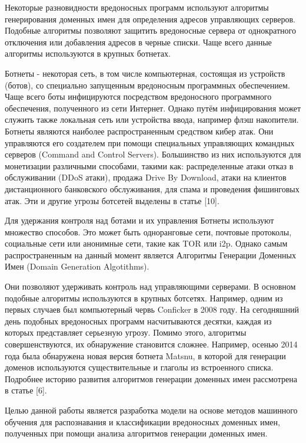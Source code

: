 
Некоторые разновидности вредоносных программ используют алгоритмы генерирования доменных имен для определения адресов управляющих серверов. Подобные алгоритмы позволяют защитить вредоносные сервера от однократного отключения или добавления адресов в черные списки. Чаще всего данные алгоритмы используются в крупных ботнетах.

Ботнеты - некоторая сеть, в том числе компьютерная, состоящая из устройств (ботов), со специально запущенным вредоносным программных обеспечением. Чаще всего боты инфицируются посредством вредоносного программного обеспечения, полученного из сети Интернет. Однако путём инфицирования может служить также локальная сеть или устройства ввода, например флэш накопители. Ботнеты являются наиболее распространенным средством кибер атак. Они управляются его создателем при помощи специальных управляющих командных серверов (Command and Control Servers). Большинство из них используются для монетизации различными способами, такими как: распределенные атаки отказ в обслуживании (DDoS атаки), продажа Drive By Download, атаки на клиентов дистанционного банковского обслуживания, для спама и проведения фишинговых атак. Эти и другие угрозы ботсетей выделены в статье [10].

Для удержания контроля над ботами и их управления Ботнеты используют множество способов. Это может быть одноранговые сети, почтовые протоколы, социальные сети или анонимные сети, такие как TOR или i2p.
Однако самым распространенным на данный момент является Алгоритмы Генерации Доменных Имен (Domain Generation Algotithms).

Они позволяют удерживать контроль над управляющими серверами. В основном подобные алгоритмы используются в крупных ботсетях. Например, одним из первых случаев был компьютерный червь Conficker в 2008 году. На сегодняшний день подобных вредоносных программ насчитываются десятки, каждая из которых представляет серьезную угрозу. Помимо этого, алгоритмы совершенствуются, их обнаружение становится сложнее. Например, осенью 2014 года была обнаружена новая версия ботнета Matsnu, в которой для генерации доменов используются существительные и глаголы из встроенного списка. Подробнее историю развития алгоритмов генерации доменных имен рассмотрена в статье [6].

Целью данной работы является разработка модели на основе методов машинного обучения для распознавания и классификации вредоносных доменных имен, полученных при помощи анализа алгоритмов генерации доменных имен.

